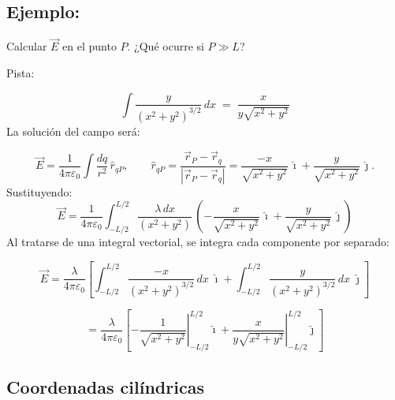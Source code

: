 \documentclass[a4paper,12pt]{article}
\begin{document}
\newpage

\subsection*{Ejemplo:}

Calcular $\vec E$ en el punto $P$.  
¿Qué ocurre si $P \gg L$?

\begin{center}
\end{center}

\noindent Pista: 

\[
\int \frac{y}{(x^2+y^2)^{3/2}}\,dx \;=\; \frac{x}{y\sqrt{x^2+y^2}}
\]
La solución del campo será:

\[
\vec E = \frac{1}{4\pi\varepsilon_0} \int \frac{dq}{r^2}\,\hat r_{qP},
\qquad
\hat r_{qP} = \frac{\vec r_P-\vec r_q}{|\vec r_P-\vec r_q|}
= \frac{-x}{\sqrt{x^2+y^2}}\,\hat{\imath} + \frac{y}{\sqrt{x^2+y^2}}\,\hat{\jmath}.
\]
Sustituyendo:
\[
\vec E = \frac{1}{4\pi\varepsilon_0} \int_{-L/2}^{L/2}
\frac{\lambda\,dx}{(x^2+y^2)}\,
\left( -\frac{x}{\sqrt{x^2+y^2}}\,\hat{\imath}
+ \frac{y}{\sqrt{x^2+y^2}}\,\hat{\jmath} \right)
\]
Al tratarse de una integral vectorial, se integra cada componente por separado:

\[
\vec E =
\frac{\lambda}{4\pi\varepsilon_0} \left[
\int_{-L/2}^{L/2} \frac{-x}{(x^2+y^2)^{3/2}}\,dx \;\hat{\imath}
+ \int_{-L/2}^{L/2} \frac{y}{(x^2+y^2)^{3/2}}\,dx \;\hat{\jmath}
\right]
\]

\[
= \frac{\lambda}{4\pi\varepsilon_0} \left[
\left. -\frac{1}{\sqrt{x^2+y^2}} \right|_{-L/2}^{L/2} \hat{\imath}
+ \left. \frac{x}{y\sqrt{x^2+y^2}} \right|_{-L/2}^{L/2} \hat{\jmath}
\right]
\]


\newpage
\subsection*{Coordenadas cilíndricas}
\end{document}
